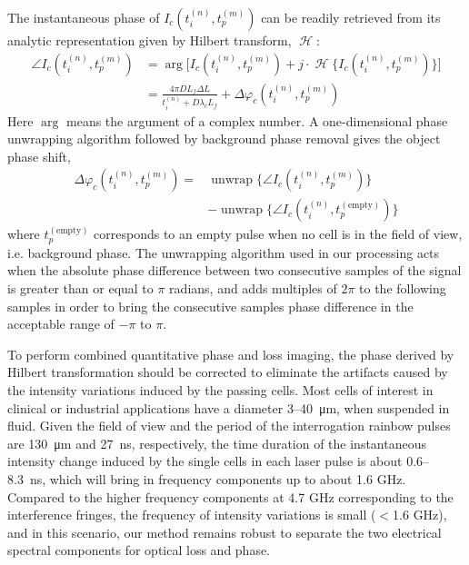 \documentclass[aps,pra,reprint,superscriptaddress]{revtex4-1}
\DeclareMathOperator{\hilbert}{\mathcal{H}} %
\DeclareMathOperator{\unwrap}{unwrap} %
\begin{document}
The instantaneous phase of $I_c(t_i^{(n)}, t_p^{(m)})$ can be readily retrieved from its analytic representation given by Hilbert transform, $\hilbert$:
\begin{equation} \label{eqn:angle}
\begin{split}
\angle I_c(t_i^{(n)}, t_p^{(m)}) &= \arg\Big[I_c(t_i^{(n)}, t_p^{(m)}) + j \cdot \hilbert \lbrace I_c(t_i^{(n)}, t_p^{(m)}) \rbrace\Big] \\
&=  \frac{4\pi D L_f\Delta L}{t_i^{(n)} + D\lambda_c L_f} + \Delta \varphi_c(t_i^{(n)}, t_p^{(m)})
\end{split}
\end{equation}
Here $\arg$ means the argument of a complex number. A one-dimensional phase unwrapping algorithm followed by background phase removal gives the object phase shift, 
\begin{equation}
\begin{split}
\Delta\varphi_c(t_i^{(n)}, t_p^{(m)}) = &\unwrap \lbrace \angle I_c(t_i^{(n)}, t_p^{(m)}) \rbrace \\
&- \unwrap \lbrace \angle I_c(t_i^{(n)}, t_p^{(\text{empty})}) \rbrace
\end{split}
\end{equation}
where $t_p^{(\text{empty})}$ corresponds to an empty pulse when no cell is in the field of view, i.e. background phase. The unwrapping algorithm used in our processing acts when the absolute phase difference between two consecutive samples of the signal is greater than or equal to $\pi$ radians, and adds multiples of $2\pi$ to the following samples in order to bring the consecutive samples phase difference in the acceptable range of $-\pi$ to $\pi$. 

To perform combined quantitative phase and loss imaging, the phase derived by Hilbert transformation should be corrected to eliminate the artifacts caused by the intensity variations induced by the passing cells. Most cells of interest in clinical or industrial applications have a diameter 3--\SI{40}{\micro\meter}, when suspended in fluid. Given the field of view and the period of the interrogation rainbow pulses are \SI{130}{\micro\meter} and \SI{27}{\nano\second}, respectively, the time duration of the instantaneous intensity change induced by the single cells in each laser pulse is about 0.6--\SI{8.3}{\nano\second}, which will bring in frequency components up to about 1.6 GHz. Compared to the higher frequency components at 4.7 GHz corresponding to the interference fringes, the frequency of intensity variations is small ($<$1.6 GHz), and in this scenario, our method remains robust to separate the two electrical spectral components for optical loss and phase.
\end{document}
